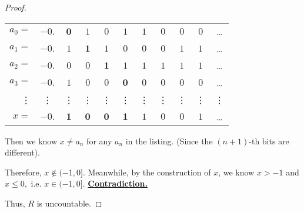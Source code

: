 \documentclass{article}
\begin{document}
\begin{proof}
    \begin{table}[htbp]
        \centering
        \begin{tabular}{rcccccccccc}
            $a_0=$ & $-0.$ & $\boldsymbol{0}$ & $1$ & $0$ & $1$ & $1$ & $0$ & $0$ & $0$ & \dots \\
            $a_1=$ & $-0.$ & $1$ & $\boldsymbol{1}$ & $1$ & $0$ & $0$ & $0$ & $1$ & $1$ & \dots \\
            $a_2=$ & $-0.$ & $0$ & $0$ & $\boldsymbol{1}$ & $1$ & $1$ & $1$ & $1$ & $1$ & \dots \\
            $a_3=$ & $-0.$ & $1$ & $0$ & $0$ & $\boldsymbol{0}$ & $0$ & $0$ & $0$ & $0$ & \dots \\
            \vdots & \vdots & \vdots & \vdots & \vdots & \vdots & \vdots & \vdots & \vdots & \vdots & \vdots \\
            $x=$ & $-0.$ & $\boldsymbol{1}$ & $\boldsymbol{0}$ & $\boldsymbol{0}$ & $\boldsymbol{1}$ & $1$ & $0$ & $0$ & $1$ & \dots \\
        \end{tabular}
    \end{table}
    
    \vspace{-0.75em} \hspace{1.3em}
    Then we know $x\neq a_n$ for any $a_n$ in the listing. (Since the $(n+1)$-th bits are different).

    \hspace{1.3em}
    Therefore, $x\notin (-1,0].$ 
    Meanwhile, by the construction of $x$, we know $x>-1$ and $x\le 0,$ i.e. $x\in(-1,0]$. \underline{\textbf{Contradiction.}}

    \vspace{1em} \hspace{1.3em}
    Thus, $R$ is uncountable.
\end{proof}
    
\vspace{1em}
\end{document}
